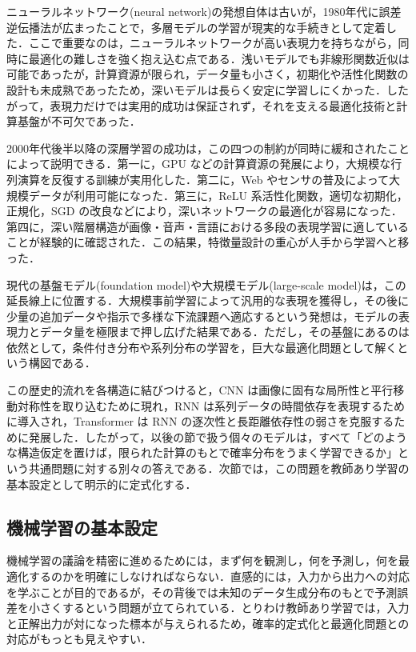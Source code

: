ニューラルネットワーク(neural network)の発想自体は古いが，1980年代に誤差逆伝播法が広まったことで，多層モデルの学習が現実的な手続きとして定着した．ここで重要なのは，ニューラルネットワークが高い表現力を持ちながら，同時に最適化の難しさを強く抱え込む点である．浅いモデルでも非線形関数近似は可能であったが，計算資源が限られ，データ量も小さく，初期化や活性化関数の設計も未成熟であったため，深いモデルは長らく安定に学習しにくかった．したがって，表現力だけでは実用的成功は保証されず，それを支える最適化技術と計算基盤が不可欠であった．

2000年代後半以降の深層学習の成功は，この四つの制約が同時に緩和されたことによって説明できる．第一に，GPU などの計算資源の発展により，大規模な行列演算を反復する訓練が実用化した．第二に，Web やセンサの普及によって大規模データが利用可能になった．第三に，ReLU 系活性化関数，適切な初期化，正規化，SGD の改良などにより，深いネットワークの最適化が容易になった．第四に，深い階層構造が画像・音声・言語における多段の表現学習に適していることが経験的に確認された．この結果，特徴量設計の重心が人手から学習へと移った．

現代の基盤モデル(foundation model)や大規模モデル(large-scale model)は，この延長線上に位置する．大規模事前学習によって汎用的な表現を獲得し，その後に少量の追加データや指示で多様な下流課題へ適応するという発想は，モデルの表現力とデータ量を極限まで押し広げた結果である．ただし，その基盤にあるのは依然として，条件付き分布や系列分布の学習を，巨大な最適化問題として解くという構図である．

この歴史的流れを各構造に結びつけると，CNN は画像に固有な局所性と平行移動対称性を取り込むために現れ，RNN は系列データの時間依存を表現するために導入され，Transformer は RNN の逐次性と長距離依存性の弱さを克服するために発展した．したがって，以後の節で扱う個々のモデルは，すべて「どのような構造仮定を置けば，限られた計算のもとで確率分布をうまく学習できるか」という共通問題に対する別々の答えである．次節では，この問題を教師あり学習の基本設定として明示的に定式化する．

\subsection{機械学習の基本設定}
機械学習の議論を精密に進めるためには，まず何を観測し，何を予測し，何を最適化するのかを明確にしなければならない．直感的には，入力から出力への対応を学ぶことが目的であるが，その背後では未知のデータ生成分布のもとで予測誤差を小さくするという問題が立てられている．とりわけ教師あり学習では，入力と正解出力が対になった標本が与えられるため，確率的定式化と最適化問題との対応がもっとも見えやすい．

